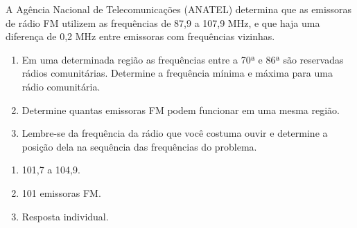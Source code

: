 \documentclass[10 pt,usenames,dvipsnames, oneside]{article}
\begin{document}
A Agência Nacional de Telecomunicações (ANATEL) determina que as emissoras de rádio FM utilizem as frequências de 87,9 a 107,9 MHz, e que haja uma diferença de 0,2 MHz entre emissoras com frequências vizinhas.
\begin{enumerate}
\item Em uma determinada região as frequências entre a 70ª e 86ª são reservadas rádios comunitárias. Determine a frequência mínima e máxima para uma rádio comunitária.
\item Determine quantas emissoras FM podem funcionar em uma mesma região.
\item Lembre-se da frequência da rádio que você costuma ouvir e determine a posição dela na sequência das frequências do problema.
\end{enumerate}
\ifdefined\prof
\begin{solucao}
\begin{enumerate}

\item 101,7 a 104,9.
\item 101 emissoras FM.
\item Resposta individual.

\end{enumerate}
\end{solucao}
\fi
\end{document}
